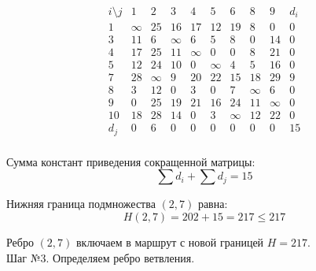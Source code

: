 \documentclass{article}
\begin{document}
\[
    \begin{array}{c|cccccccc|c}
        i \setminus j & 1      & 2      & 3      & 4      & 5      & 6      & 8      & 9      & d_i \\
        \hline
        1             & \infty & 25     & 16     & 17     & 12     & 19     & 8      & 0      & 0   \\
        3             & 11     & 6      & \infty & 6      & 5      & 8      & 0      & 14     & 0   \\
        4             & 17     & 25     & 11     & \infty & 0      & 0      & 8      & 21     & 0   \\
        5             & 12     & 24     & 10     & 0      & \infty & 4      & 5      & 16     & 0   \\
        7             & 28     & \infty & 9      & 20     & 22     & 15     & 18     & 29     & 9   \\
        8             & 3      & 12     & 0      & 3      & 0      & 7      & \infty & 6      & 0   \\
        9             & 0      & 25     & 19     & 21     & 16     & 24     & 11     & \infty & 0   \\
        10            & 18     & 28     & 14     & 0      & 3      & \infty & 12     & 22     & 0   \\
        \hline
        d_j           & 0      & 6      & 0      & 0      & 0      & 0      & 0      & 0      & 15  \\
    \end{array}
\]

Сумма констант приведения сокращенной матрицы:
\[
    \sum d_i + \sum d_j = 15
\]

Нижняя граница подмножества $(2,7)$ равна:
\[
    H(2,7) = 202 + 15 = 217 \leq 217
\]

Ребро $(2,7)$ включаем в маршрут с новой границей $H=217$.\\
Шаг №3.
Определяем ребро ветвления.
\end{document}
